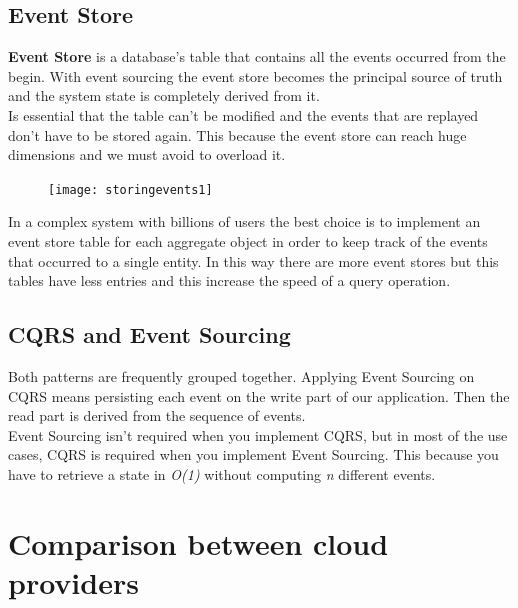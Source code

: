 \documentclass[11pt]{article} %
\begin{document}
\subsection{Event Store}
\textbf{Event Store} is a database's table that contains all the events occurred from the begin.
With event sourcing the event store becomes the principal source of truth and the system state is completely derived from it. \\
Is essential that the table can't be modified and the events that are replayed don't have to be stored again. 
This because the event store can reach huge dimensions and we must avoid to overload it.\\
\begin{figure} [H]
	\centering
	\texttt{[image: storingevents1]} \\
\end{figure}
In a complex system with billions of users the best choice is to implement an event store table for each aggregate object in order to keep track of the events that occurred to a single entity. In this way there are more event stores but this tables have less entries and this increase the speed of a query operation.

\subsection{CQRS and Event Sourcing}
Both patterns are frequently grouped together. Applying Event Sourcing on  CQRS means persisting each event on the write part of our application. Then the read part is derived from the sequence of events. \\
Event Sourcing isn't required when you implement CQRS, but in most of the use cases, CQRS is required when you implement Event Sourcing. This because you have to retrieve a state in \emph{O(1)} without computing \emph{n} different events.
\newpage
\section{Comparison between cloud providers} 
\end{document}
